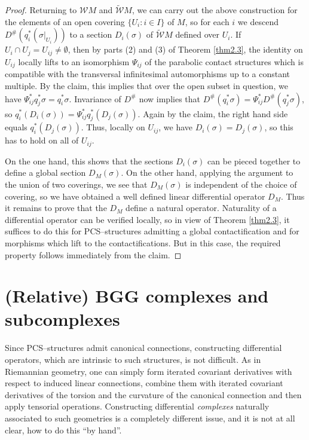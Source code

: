 \documentclass[12pt,a4paper]{amsart}
\def\Cal{\mathcal}
\newcommand{\si}{\sigma}
\newcommand{\Ps}{\Psi}
\newcommand{\tcw}{{\tilde{\Cal W}}}
\numberwithin{theorem}{section}
\theoremstyle{definition}
\theoremstyle{remark}
\begin{document}
\begin{proof}
Returning to $\Cal WM$ and $\tcw M$, we can carry out the above
construction for the elements of an open covering $\{U_i:i\in I\}$ of
$M$, so for each $i$ we descend $D^\#(q_i^*(\si|_{U_i}))$ to a section
$D_i(\si)$ of $\tcw M$ defined over $U_i$. If $U_i\cap
U_j=U_{ij}\neq\emptyset$, then by parts (2) and (3) of Theorem
\ref{thm2.3}, the identity on $U_{ij}$ locally lifts to an isomorphism
$\Ps_{ij}$ of the parabolic contact structures which is compatible
with the transversal infinitesimal automorphisms up to a constant
multiple. By the claim, this implies that over the open subset in
question, we have $\Ps_{ij}^*q_j^*\si=q_i^*\si$. Invariance of $D^\#$
now implies that $D^\#(q_i^*\si)=\Ps_{ij}^*D^\#(q_j^*\si)$, so
$q_i^*(D_i(\si))=\Ps_{ij}^*q_j^*(D_j(\si))$. Again by the claim, the
right hand side equals $q_i^*(D_j(\si))$. Thus, locally on $U_{ij}$,
we have $D_i(\si)=D_j(\si)$, so this has to hold on all of $U_{ij}$.

On the one hand, this shows that the sections $D_i(\si)$ can be pieced
together to define a global section $D_M(\si)$. On the other hand,
applying the argument to the union of two coverings, we see that
$D_M(\si)$ is independent of the choice of covering, so we have
obtained a well defined linear differential operator $D_M$. Thus it
remains to prove that the $D_M$ define a natural operator. Naturality
of a differential operator can be verified locally, so in view of
Theorem \ref{thm2.3}, it suffices to do this for PCS--structures
admitting a global contactification and for morphisms which lift to
the contactifications. But in this case, the required property follows
immediately from the claim.
\end{proof}

\section{(Relative) BGG complexes and subcomplexes}\label{3} 
Since PCS--structures admit canonical connections, constructing
differential operators, which are intrinsic to such structures, is not
difficult. As in Riemannian geometry, one can simply form iterated
covariant derivatives with respect to induced linear connections,
combine them with iterated covariant derivatives of the torsion and
the curvature of the canonical connection and then apply tensorial
operations. Constructing differential \textit{complexes} naturally
associated to such geometries is a completely different issue, and it
is not at all clear, how to do this ``by hand''.
\end{document}
